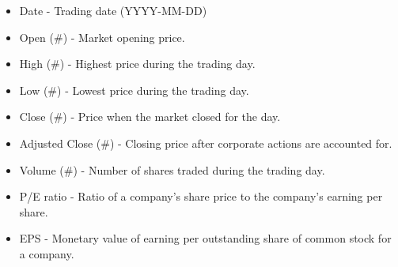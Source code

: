 \documentclass{article}
\begin{document}
	\begin{itemize}
		\item Date - Trading date (YYYY-MM-DD)
		\item Open (\#) - Market opening price.
		\item High (\#) - Highest price during the trading day.
		\item Low (\#) - Lowest price during the trading day.
		\item Close (\#) - Price when the market closed for the day.
		\item Adjusted Close (\#) - Closing price after corporate actions are accounted for.
		\item Volume (\#) - Number of shares traded during the trading day.
		\item P/E ratio - Ratio of a company's share price to the company's earning per share.
		\item EPS - Monetary value of earning per outstanding share of common stock for a company.
	\end{itemize}
	
\end{document}
